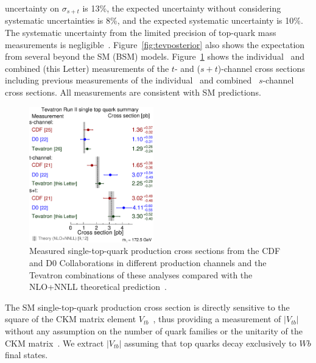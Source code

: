 \documentclass[aps,prl,twocolumn,showpacs,superscriptaddress,groupedaddress]{revtex4}  %
\begin{document}
uncertainty on $\sigma_{s+t}$ is 13\%, the expected uncertainty
without considering systematic uncertainties is 8\%, and the
expected systematic uncertainty is 10\%. The systematic
uncertainty from the limited precision of top-quark mass measurements
is negligible~\cite{cdf-prd-2010,d0_schannel}. Figure~\ref{fig:tevposterior} 
also shows the expectation from several beyond the SM (BSM) models. 
Figure~\ref{fig:tevxsec} shows the
individual~\cite{cdf_channels,d0_schannel} and combined (this Letter)
measurements of the $t$- and ($s+t$)-channel cross sections including
previous measurements of the
individual~\cite{cdf_schannel,d0_schannel} and
combined~\cite{tev_schannel} $s$-channel cross sections. All
measurements are consistent with SM predictions.
%
\begin{figure}[!h!tbp]
\begin{center}
\includegraphics[width=0.48\textwidth]{fig03.eps}
\caption{Measured single-top-quark production cross
  sections from the CDF and D0 Collaborations in different production
  channels and the Tevatron combinations of these analyses compared
  with the NLO+NNLL theoretical
  prediction~\cite{schannel-kidonakis,tchannel-kidonakis}.}
\label{fig:tevxsec}
\end{center}
\end{figure}

The SM single-top-quark production cross section is directly sensitive
to the square of the CKM matrix element
$V_{tb}$~\cite{tchannel-kidonakis,schannel-kidonakis}, thus  
providing a measurement of $|V_{tb}|$ without any assumption
on the number of quark families or the unitarity of the CKM
matrix~\cite{d0-prd-2008}.  
We extract $|V_{tb}|$ assuming that top quarks decay exclusively to
$Wb$ final states.  
\end{document}
